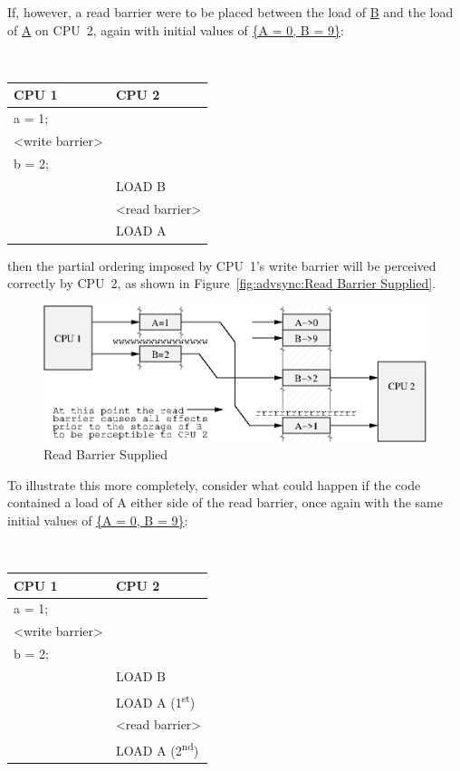If, however, a read barrier were to be placed between the load of \url{B}
and the load of \url{A} on CPU~2, again with initial values of
\url{{A = 0, B = 9}}:

\vspace{5pt}
\begin{minipage}[t]{\columnwidth}
\tt
\begin{tabular}{l|p{1.5in}}
	CPU 1 &		CPU 2 \\
	\hline
	a = 1; & \\
	<write barrier> & \\
	b = 2; & \\
		&	LOAD B \\
		&	<read barrier> \\
		&	LOAD A \\
\end{tabular}
\end{minipage}
\vspace{5pt}

then the partial ordering imposed by CPU~1's write barrier will be
perceived correctly by CPU~2, as shown in
Figure~\ref{fig:advsync:Read Barrier Supplied}.

\begin{figure}[htb]
\begin{center}
\includegraphics{advsync/ReadBarrierSupplied}
\end{center}
\caption{Read Barrier Supplied}
\end{figure}

To illustrate this more completely, consider what could happen if the code
contained a load of A either side of the read barrier, once again
with the same initial values of
\url{{A = 0, B = 9}}:

\vspace{5pt}
\begin{minipage}[t]{\columnwidth}
\tt
\begin{tabular}{l|p{1.5in}}
	CPU 1 &		CPU 2 \\
	\hline
	a = 1; & \\
	<write barrier> & \\
	b = 2; & \\
		&	LOAD B \\
		&	LOAD A (1\textsuperscript{st}) \\
		&	<read barrier> \\
		&	LOAD A (2\textsuperscript{nd}) \\
\end{tabular}
\end{minipage}
\vspace{5pt}

